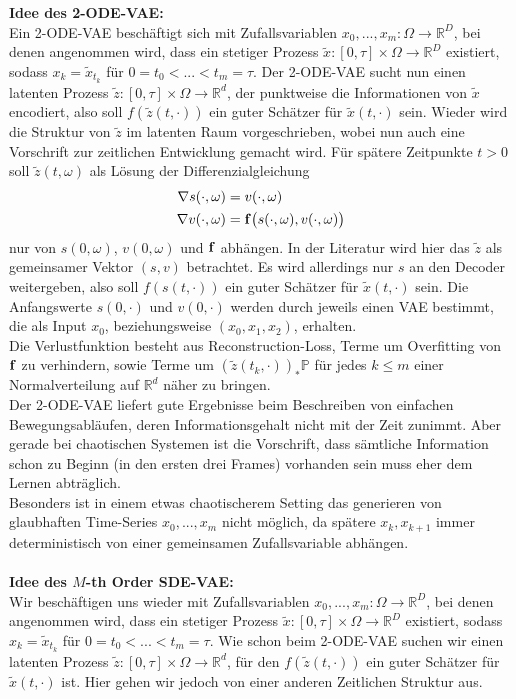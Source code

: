\documentclass[12pt]{article}
\newcommand{\R}{\mathbb{R}}
\newcommand{\tx}{\widetilde{x}}
\newcommand{\tz}{\widetilde{z}}
\newcommand{\bP}{\mathbb{P}}
\newcommand{\bbf}{\bold{f}}
\begin{document}
	\newpage\noindent
	\textbf{Idee des 2-ODE-VAE:}\\
	Ein 2-ODE-VAE beschäftigt sich mit Zufallsvariablen $x_0,...,x_m : \Omega \rightarrow \R^D$, bei denen angenommen wird, dass ein stetiger Prozess $\tx : [0,\tau] \times \Omega \rightarrow \R^D$ existiert, sodass $x_k = \tx_{t_k}$ für $0=t_0<...<t_m=\tau$. Der 2-ODE-VAE sucht nun einen latenten Prozess $\tz: [0,\tau] \times \Omega \rightarrow \R^d$, der punktweise die Informationen von $\tx$ encodiert, also soll $f(\tz(t,\cdot))$ ein guter Schätzer für $\tx(t,\cdot)$ sein. Wieder wird die Struktur von $\tz$ im latenten Raum vorgeschrieben, wobei nun auch eine Vorschrift zur zeitlichen Entwicklung gemacht wird. Für spätere Zeitpunkte $t>0$ soll $\tz(t,\omega)$ als Lösung der Differenzialgleichung
	\begin{align*}
	\nabla s(\cdot,\omega) &= v(\cdot,\omega)\\
	\nabla v(\cdot,\omega) &= \bbf\big(s(\cdot,\omega),v(\cdot,\omega)\big)
	\end{align*}
	nur von $s(0,\omega)$, $v(0,\omega)$ und $\bbf$ abhängen. In der Literatur wird hier das $\tz$ als gemeinsamer Vektor $(s,v)$ betrachtet. Es wird allerdings nur $s$ an den Decoder weitergeben, also soll $f(s(t,\cdot))$ ein guter Schätzer für $\tx(t,\cdot)$ sein. Die Anfangswerte $s(0,\cdot)$ und $v(0,\cdot)$ werden durch jeweils einen VAE bestimmt, die als Input $x_0$, beziehungsweise $(x_0,x_1,x_2)$, erhalten.\\
	Die Verlustfunktion besteht aus Reconstruction-Loss, Terme um Overfitting von $\bbf$ zu verhindern, sowie Terme um $(\tz(t_k,\cdot))_*\bP$ für jedes $k \leq m$ einer Normalverteilung auf $\R^d$ näher zu bringen.\\
	Der 2-ODE-VAE liefert gute Ergebnisse beim Beschreiben von einfachen Bewegungsabläufen, deren Informationsgehalt nicht mit der Zeit zunimmt. Aber gerade bei chaotischen Systemen ist die Vorschrift, dass sämtliche Information schon zu Beginn (in den ersten drei Frames) vorhanden sein muss eher dem Lernen abträglich.\\
	Besonders ist in einem etwas chaotischerem Setting das generieren von glaubhaften Time-Series $x_0,...,x_m$ nicht möglich, da spätere $x_k, x_{k+1}$ immer deterministisch von einer gemeinsamen Zufallsvariable abhängen.\\
	\\
	\textbf{Idee des $M$-th Order SDE-VAE:}\\
	Wir beschäftigen uns wieder mit Zufallsvariablen $x_0,...,x_m : \Omega \rightarrow \R^D$, bei denen angenommen wird, dass ein stetiger Prozess $\tx : [0,\tau] \times \Omega \rightarrow \R^D$ existiert, sodass $x_k = \tx_{t_k}$ für $0=t_0<...<t_m=\tau$. Wie schon beim 2-ODE-VAE suchen wir einen latenten Prozess $\tz: [0,\tau] \times \Omega \rightarrow \R^d$, für den $f(\tz(t,\cdot))$ ein guter Schätzer für $\tx(t,\cdot)$ ist. Hier gehen wir jedoch von einer anderen Zeitlichen Struktur aus.\\
\end{document}
